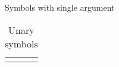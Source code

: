 \documentclass[]{clseminar}
\begin{document}
        Symbols with single argument

        \begin{table}
        \begin{tabular}{lcl}
            \showmath{\rwStep}
            \showmath{\defEQ}
            \showmath{\defEV}
        \end{tabular}
        \caption{Unary symbols}
    \end{table}

    
\end{document}
